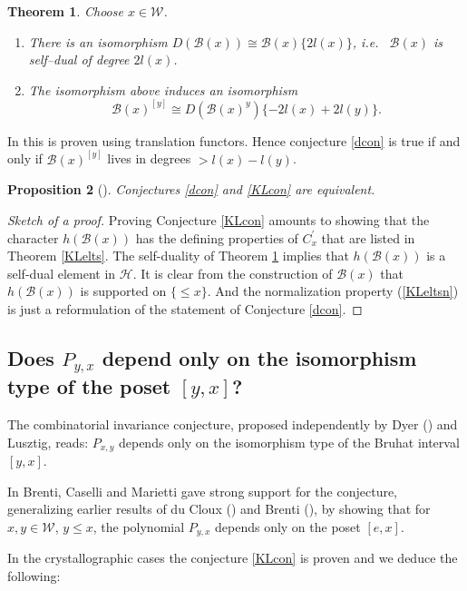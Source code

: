 \documentclass[12pt]{amsart}
\newtheorem{theorem}{Theorem}[section]
\newtheorem{proposition}[theorem]{Proposition}
\theoremstyle{definition}
\theoremstyle{remark}
\newcommand{\CH}{{\mathcal H}}
\newcommand{\CW}{{\mathcal W}}
\newcommand{\SB}{{\mathscr B}}
\begin{document}
\begin{theorem}\label{duality} Choose $x\in\CW$.
\begin{enumerate}
\item There is an isomorphism $D(\SB(x))\cong \SB(x)\{2l(x)\}$, i.e.~ $\SB(x)$ is self--dual of degree $2l(x)$.
\item The isomorphism above induces an isomorphism 
$$
\SB(x)^{[y]}\cong D(\SB(x)^y)\{-2l(x)+2l(y)\}.
$$
\end{enumerate}
\end{theorem}
In \cite{Fie2} this is proven using translation functors. Hence conjecture \ref{dcon} is true if and only if  $\SB(x)^{[y]}$ lives in degrees $>l(x)-l(y)$. 





\begin{proposition}[\cite{Fie2}] Conjectures \ref{dcon} and \ref{KLcon} are equivalent.
\end{proposition}
\begin{proof}[Sketch of a proof] Proving Conjecture \ref{KLcon} amounts to showing that the character $h(\SB(x))$ has the defining properties of $C^\prime_x$ that are listed in Theorem \ref{KLelts}. 
The self-duality of Theorem \ref{duality} implies that $h(\SB(x))$ is a self-dual element in $\CH$. It is clear from the construction of $\SB(x)$ that $h(\SB(x))$ is supported on $\{\leq x\}$. And the normalization property (\ref{KLeltsn}) is just a reformulation of the statement of Conjecture \ref{dcon}.
\end{proof}





\subsection{Does $P_{y,x}$ depend only on the isomorphism type of the poset $[y,x]$?}\label{Dycon}

The combinatorial invariance conjecture, proposed independently by Dyer (\cite{Dye}) and Lusztig, reads:  
$P_{x,y}$ depends only on the isomorphism type of the Bruhat interval $[y,x]$. 

In \cite{BCM} Brenti, Caselli and Marietti gave strong support for the conjecture, generalizing  earlier results of du Cloux (\cite{dC}) and Brenti (\cite{Br2}), by showing that for $x,y\in\CW$, $y\leq x$, the polynomial $P_{y,x}$ depends only on the poset $[e,x]$.

In the crystallographic cases the conjecture \ref{KLcon} is proven and we deduce the following:
\end{document}
